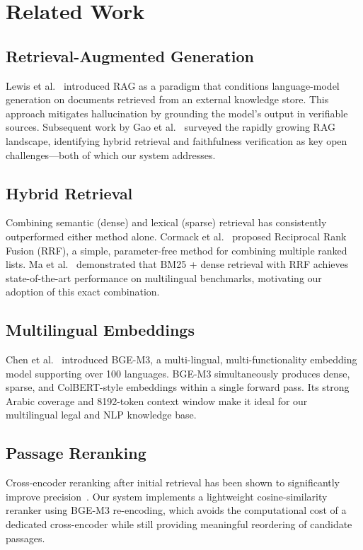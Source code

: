 \documentclass[12pt, a4paper]{article}
\begin{document}
\section{Related Work}

\subsection{Retrieval-Augmented Generation}
Lewis et al.~\cite{lewis2020rag} introduced RAG as a paradigm that
conditions language-model generation on documents retrieved from an external
knowledge store. This approach mitigates hallucination by grounding the
model's output in verifiable sources. Subsequent work by Gao et
al.~\cite{gao2024ragsurvey} surveyed the rapidly growing RAG landscape,
identifying hybrid retrieval and faithfulness verification as key open
challenges---both of which our system addresses.

\subsection{Hybrid Retrieval}
Combining semantic (dense) and lexical (sparse) retrieval has consistently
outperformed either method alone. Cormack et al.~\cite{cormack2009rrf}
proposed Reciprocal Rank Fusion (RRF), a simple, parameter-free method
for combining multiple ranked lists. Ma et al.~\cite{ma2024bm25rrf} demonstrated
that BM25 + dense retrieval with RRF achieves state-of-the-art performance on
multilingual benchmarks, motivating our adoption of this exact combination.

\subsection{Multilingual Embeddings}
Chen et al.~\cite{chen2024bgem3} introduced BGE-M3, a multi-lingual,
multi-functionality embedding model supporting over 100 languages. BGE-M3
simultaneously produces dense, sparse, and ColBERT-style embeddings within a
single forward pass. Its strong Arabic coverage and 8192-token context window
make it ideal for our multilingual legal and NLP knowledge base.

\subsection{Passage Reranking}
Cross-encoder reranking after initial retrieval has been shown to significantly
improve precision~\cite{nogueira2019passage}. Our system implements a
lightweight cosine-similarity reranker using BGE-M3 re-encoding, which
avoids the computational cost of a dedicated cross-encoder while still
providing meaningful reordering of candidate passages.
\end{document}
